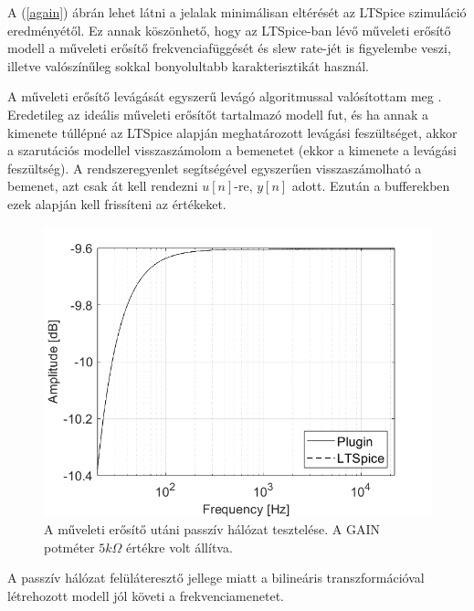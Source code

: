 A (\ref{again}) ábrán lehet látni a jelalak minimálisan eltérését az LTSpice szimuláció eredményétől. 
Ez annak köszönhető, hogy az LTSpice-ban lévő műveleti erősítő modell a műveleti erősítő frekvenciafüggését és slew 
rate-jét is figyelembe veszi, illetve valószínűleg sokkal bonyolultabb karakterisztikát használ.

A műveleti erősítő levágását egyszerű levágó algoritmussal valósítottam meg \cite{opampo} \cite{opamp}. Eredetileg az ideális műveleti erősítőt tartalmazó modell fut, és ha annak a kimenete túllépné az LTSpice alapján meghatározott levágási feszültséget, akkor a szarutációs modellel visszaszámolom a bemenetet (ekkor a kimenete a levágási feszültség). A rendszeregyenlet segítségével egyszerűen visszaszámolható a bemenet, azt csak át kell rendezni $u[n]$-re, $y[n]$ adott. Ezután a bufferekben ezek alapján kell frissíteni az értékeket.
\begin{figure}[H]
    \centering
    \includegraphics[scale=0.5]{figures/stage2after.png}
    \caption{A műveleti erősítő utáni passzív hálózat tesztelése. A GAIN potméter $5k\Omega$ értékre volt állítva.}
\end{figure}
A passzív hálózat felüláteresztő jellege miatt a bilineáris transzformációval létrehozott modell jól követi a frekvenciamenetet. 

